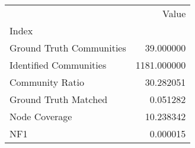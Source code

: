 \begin{tabular}{lr}
\toprule
{} &        Value \\
Index                    &              \\
\midrule
Ground Truth Communities &    39.000000 \\
Identified Communities   &  1181.000000 \\
Community Ratio          &    30.282051 \\
Ground Truth Matched     &     0.051282 \\
Node Coverage            &    10.238342 \\
NF1                      &     0.000015 \\
\bottomrule
\end{tabular}
